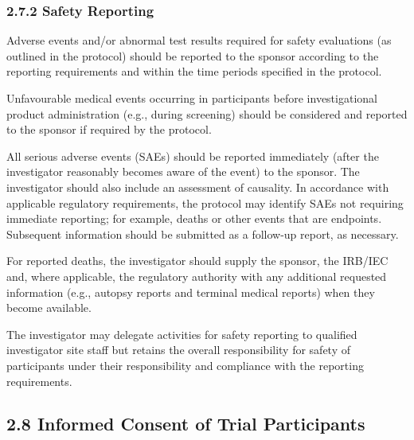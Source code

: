 \documentclass[11pt]{article}
\begin{document}
\subsubsection{2.7.2 Safety Reporting}

\begin{description}[leftmargin=2.5cm,style=sameline]

\item[(a)] Adverse events and/or abnormal test results required for safety evaluations (as outlined in the protocol) should be reported to the sponsor according to the reporting requirements and within the time periods specified in the protocol.

\end{description}

Unfavourable medical events occurring in participants before investigational product administration (e.g., during screening) should be considered and reported to the sponsor if required by the protocol.


\begin{description}[leftmargin=2.5cm,style=sameline]

\item[(b)] All serious adverse events (SAEs) should be reported immediately (after the investigator reasonably becomes aware of the event) to the sponsor. The investigator should also include an assessment of causality. In accordance with applicable regulatory requirements, the protocol may identify SAEs not requiring immediate reporting; for example, deaths or other events that are endpoints. Subsequent information should be submitted as a follow-up report, as necessary.

\item[(c)] For reported deaths, the investigator should supply the sponsor, the IRB/IEC and, where applicable, the regulatory authority with any additional requested information (e.g., autopsy reports and terminal medical reports) when they become available.

\item[(d)] The investigator may delegate activities for safety reporting to qualified investigator site staff but retains the overall responsibility for safety of participants under their responsibility and compliance with the reporting requirements.

\end{description}

\subsection{2.8 Informed Consent of Trial Participants}
\end{document}
